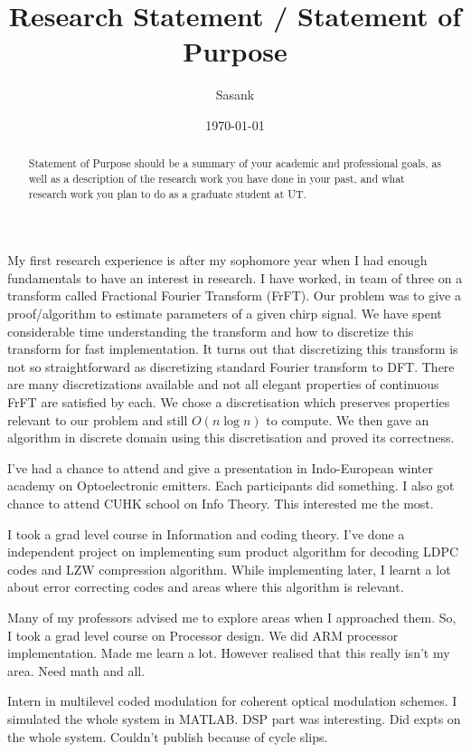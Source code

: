 \documentclass[a4paper]{article}
\begin{document}
\title{Research Statement / Statement of Purpose}
\author{Sasank}
\date{\today}
\maketitle
\begin{abstract}
Statement of Purpose should be a summary of your academic and professional goals, as well as a description of the research work you have done in your past, and what research work you plan to do as a graduate student at UT.
\end{abstract}


My first research experience is after my sophomore year when I had enough fundamentals to have an interest in research. 
I have worked, in team of three on a transform called Fractional Fourier Transform (FrFT).
Our problem was to give a proof/algorithm to estimate parameters of a given chirp signal. 
We have spent considerable time understanding the transform and how to discretize this transform for fast implementation. 
It turns out that discretizing this transform is not so straightforward as discretizing standard Fourier transform to DFT. There are many discretizations available and not all elegant properties of continuous FrFT are satisfied by each. 
We chose a discretisation which preserves properties relevant to our problem and still $O(n\log n)$ to compute. We then gave an algorithm in discrete domain using this discretisation and proved its correctness.

I've had a chance to attend and give a presentation in Indo-European winter academy on Optoelectronic emitters. Each participants did something.
I also got chance to attend CUHK school on Info Theory. This interested me the most.

I took a grad level course in Information and coding theory. 
I've done a independent project on implementing sum product algorithm for decoding LDPC codes and LZW compression algorithm.
While implementing later, I learnt a lot about error correcting codes and areas where this algorithm is relevant.

Many of my professors advised me to explore areas when I approached them. 
So, I took a grad level course on Processor design. We did ARM processor implementation. Made me learn a lot. However realised that this really isn't my area. Need math and all.


Intern in multilevel coded modulation for coherent optical modulation schemes.
I simulated the whole system in MATLAB. DSP part was interesting. 
Did expts on the whole system.
Couldn't publish because of cycle slips.
\end{document}
